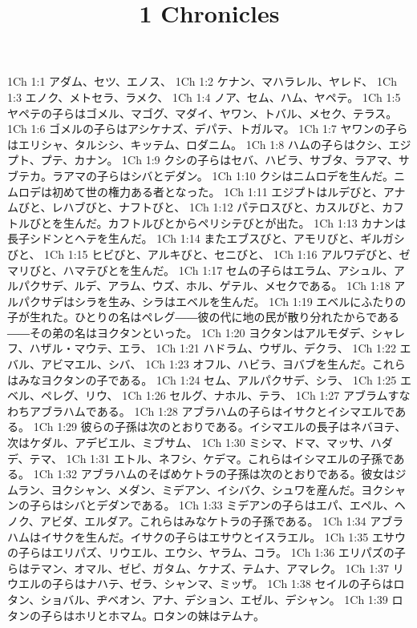 

\title{1 Chronicles}

1Ch 1:1  アダム、セツ、エノス、
1Ch 1:2  ケナン、マハラレル、ヤレド、
1Ch 1:3  エノク、メトセラ、ラメク、
1Ch 1:4  ノア、セム、ハム、ヤペテ。
1Ch 1:5  ヤペテの子らはゴメル、マゴグ、マダイ、ヤワン、トバル、メセク、テラス。
1Ch 1:6  ゴメルの子らはアシケナズ、デパテ、トガルマ。
1Ch 1:7  ヤワンの子らはエリシャ、タルシシ、キッテム、ロダニム。
1Ch 1:8  ハムの子らはクシ、エジプト、プテ、カナン。
1Ch 1:9  クシの子らはセバ、ハビラ、サブタ、ラアマ、サブテカ。ラアマの子らはシバとデダン。
1Ch 1:10  クシはニムロデを生んだ。ニムロデは初めて世の権力ある者となった。
1Ch 1:11  エジプトはルデびと、アナムびと、レハブびと、ナフトびと、
1Ch 1:12  パテロスびと、カスルびと、カフトルびとを生んだ。カフトルびとからペリシテびとが出た。
1Ch 1:13  カナンは長子シドンとヘテを生んだ。
1Ch 1:14  またエブスびと、アモリびと、ギルガシびと、
1Ch 1:15  ヒビびと、アルキびと、セニびと、
1Ch 1:16  アルワデびと、ゼマリびと、ハマテびとを生んだ。
1Ch 1:17  セムの子らはエラム、アシュル、アルパクサデ、ルデ、アラム、ウズ、ホル、ゲテル、メセクである。
1Ch 1:18  アルパクサデはシラを生み、シラはエベルを生んだ。
1Ch 1:19  エベルにふたりの子が生れた。ひとりの名はペレグ――彼の代に地の民が散り分れたからである――その弟の名はヨクタンといった。
1Ch 1:20  ヨクタンはアルモダデ、シャレフ、ハザル・マウテ、エラ、
1Ch 1:21  ハドラム、ウザル、デクラ、
1Ch 1:22  エバル、アビマエル、シバ、
1Ch 1:23  オフル、ハビラ、ヨバブを生んだ。これらはみなヨクタンの子である。
1Ch 1:24  セム、アルパクサデ、シラ、
1Ch 1:25  エベル、ペレグ、リウ、
1Ch 1:26  セルグ、ナホル、テラ、
1Ch 1:27  アブラムすなわちアブラハムである。
1Ch 1:28  アブラハムの子らはイサクとイシマエルである。
1Ch 1:29  彼らの子孫は次のとおりである。イシマエルの長子はネバヨテ、次はケダル、アデビエル、ミブサム、
1Ch 1:30  ミシマ、ドマ、マッサ、ハダデ、テマ、
1Ch 1:31  エトル、ネフシ、ケデマ。これらはイシマエルの子孫である。
1Ch 1:32  アブラハムのそばめケトラの子孫は次のとおりである。彼女はジムラン、ヨクシャン、メダン、ミデアン、イシバク、シュワを産んだ。ヨクシャンの子らはシバとデダンである。
1Ch 1:33  ミデアンの子らはエパ、エペル、ヘノク、アビダ、エルダア。これらはみなケトラの子孫である。
1Ch 1:34  アブラハムはイサクを生んだ。イサクの子らはエサウとイスラエル。
1Ch 1:35  エサウの子らはエリパズ、リウエル、エウシ、ヤラム、コラ。
1Ch 1:36  エリパズの子らはテマン、オマル、ゼピ、ガタム、ケナズ、テムナ、アマレク。
1Ch 1:37  リウエルの子らはナハテ、ゼラ、シャンマ、ミッザ。
1Ch 1:38  セイルの子らはロタン、ショバル、ヂベオン、アナ、デション、エゼル、デシャン。
1Ch 1:39  ロタンの子らはホリとホマム。ロタンの妹はテムナ。
